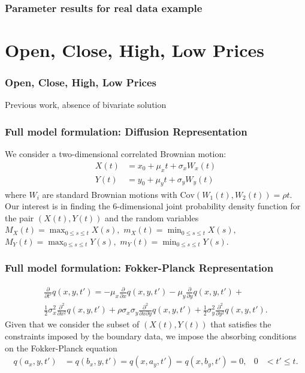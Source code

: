 \documentclass{beamer}
\begin{document}
\begin{frame}
  \frametitle{Parameter results for real data example}
\end{frame}

\section{Open, Close, High, Low Prices}
\begin{frame}
  \frametitle{Open, Close, High, Low Prices}
  Previous work, absence of bivariate solution
\end{frame}
\begin{frame}
  \frametitle{Full model formulation: Diffusion Representation}
  We consider a two-dimensional correlated Brownian motion:
\begin{align}
  X(t) &= x_0 + \mu_x t + \sigma_x W_x(t)  \label{eq:X} \\
  Y(t) &= y_0 + \mu_y t + \sigma_y W_y(t)  \label{eq:Y}
\end{align}
where $W_i$ are standard Brownian motions with
$\mbox{Cov}(W_1(t), W_2(t)) = \rho t$. Our interest is in finding the
6-dimensional joint probability density function for the pair $(X(t), Y(t))$
and the random variables $M_X(t)=\max_{0\leq s\leq t}X(s),$
$m_X(t)=\min_{0\leq s\leq t}X(s),$ $M_Y(t)=\max_{0\leq s\leq t}Y(s),$
$m_Y(t)=\min_{0\leq s\leq t}Y(s)$.
\end{frame}
\begin{frame}
  \frametitle{Full model formulation: Fokker-Planck Representation}
\begin{multline}
  \displaystyle \frac{\partial}{\partial t'} q(x,y,t') = -\mu_x \frac{\partial}{\partial x}q(x,y,t')
  - \mu_y \frac{\partial}{\partial y}q(x,y,t') + \\
  \frac{1}{2}\sigma_x^2 \frac{\partial^2}{\partial x^2}q(x,y,t') + \rho\sigma_x\sigma_y \frac{\partial^2}{\partial x \partial y}q(x,y,t')
  + \frac{1}{2}\sigma_y^2 \frac{\partial^2}{\partial y^2}q(x,y,t'). \label{eq:1}
\end{multline}
Given that we consider the subset of $(X(t), Y(t))$ that satisfies the constraints imposed by the boundary data, we impose the absorbing conditions on the Fokker-Planck equation
\begin{align}
  q(a_x, y,t') &= q(b_x,y,t') = q(x,a_y,t') = q(x,b_y,t') = 0, & 0 &< t' \leq t. \label{eq:2}
\end{align}

\end{frame}
\end{document}
